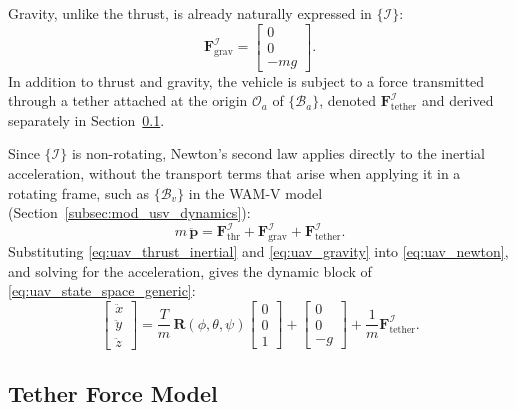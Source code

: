 Gravity, unlike the thrust, is already naturally expressed in $\{\mathcal{I}\}$:
\begin{equation}
    \mathbf{F}_{\mathrm{grav}}^{\mathcal{I}} = \begin{bmatrix} 0 \\ 0 \\ -mg \end{bmatrix}.
    \label{eq:uav_gravity}
\end{equation}
In addition to thrust and gravity, the vehicle is subject to a force transmitted through a tether attached at the origin $\mathcal{O}_a$ of $\{\mathcal{B}_a\}$, denoted $\mathbf{F}_{\mathrm{tether}}^{\mathcal{I}}$ and derived separately in Section~\ref{subsec:mod_uav_tether}.

Since $\{\mathcal{I}\}$ is non-rotating, Newton's second law applies directly to the inertial acceleration, without the transport terms that arise when applying it in a rotating frame, such as $\{\mathcal{B}_v\}$ in the WAM-V model (Section~\ref{subsec:mod_usv_dynamics}):
\begin{equation}
    m\,\ddot{\mathbf{p}} = \mathbf{F}_{\mathrm{thr}}^{\mathcal{I}} + \mathbf{F}_{\mathrm{grav}}^{\mathcal{I}} + \mathbf{F}_{\mathrm{tether}}^{\mathcal{I}}.
    \label{eq:uav_newton}
\end{equation}
Substituting \eqref{eq:uav_thrust_inertial} and \eqref{eq:uav_gravity} into \eqref{eq:uav_newton}, and solving for the acceleration, gives the dynamic block of \eqref{eq:uav_state_space_generic}:
\begin{equation}
    \begin{bmatrix} \ddot{x} \\ \ddot{y} \\ \ddot{z} \end{bmatrix} = \frac{T}{m}\,\mathbf{R}(\phi,\theta,\psi)\begin{bmatrix} 0 \\ 0 \\ 1 \end{bmatrix} + \begin{bmatrix} 0 \\ 0 \\ -g \end{bmatrix} + \frac{1}{m}\mathbf{F}_{\mathrm{tether}}^{\mathcal{I}}.
    \label{eq:uav_dynamics}
\end{equation}

\subsection{Tether Force Model}
\label{subsec:mod_uav_tether}
\label{subsec:mod_tether_force_model}


